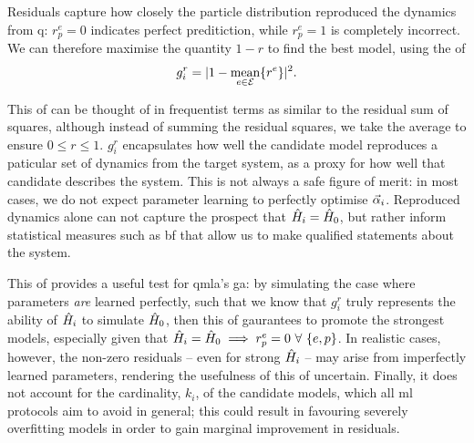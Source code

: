 Residuals capture how closely the \gls{particle} distribution reproduced the dynamics from \gls{q}:
    $r^{e}_{p} = 0$ indicates perfect preditiction, while $r^e_p=1$ is completely incorrect. 
We can therefore maximise the quantity $1-r$ to find the best model, 
    using the \gls{of}
\begin{equation}
    \label{eqn:residual_fitness}
    g^r_i = \lvert 1 - \underset{e \in { \mathcal{E} }}{\text{mean}}\{ {r^e} \}\rvert^2.
\end{equation}
\par     
This \gls{of} can be thought of in frequentist terms 
    as similar to the residual sum of squares,
    although instead of summing the residual squares, we take the average to ensure $0 \leq r \leq 1$. 
$g_i^r$ encapsulates how well the candidate model reproduces a paticular set of dynamics from the target system, 
    as a proxy for how well that candidate describes the system. 
This is not always a safe figure of merit: 
    in most cases, we do not expect parameter learning to perfectly optimise $\vec{\alpha}_i$. 
Reproduced dynamics alone can not capture the prospect that $\hat{H}_i=\hat{H}_0$, 
    but rather inform statistical measures such as \gls{bf} that allow us to make 
    qualified statements about the system. \par 

This \gls{of} provides a useful test for \gls{qmla}'s \gls{ga}:
    by simulating the case where parameters \emph{are} learned perfectly, 
    such that we know that $g_i^r$ truly represents the ability of $\hat{H}_i$ to 
    simulate $\hat{H}_0$, then this \gls{of} gaurantees to promote  the strongest models,
    especially given that $\hat{H}_i=\hat{H}_0 \implies r_p^e=0 \ \forall \ \{e, p\}$. 
In realistic cases, however, the non-zero residuals -- even for 
    strong $\hat{H}_i$ -- may arise from imperfectly learned parameters,
    rendering the usefulness of this \gls{of} uncertain. 
Finally, it does not account for the cardinality, $k_i$, of the candidate models,
    which all \gls{ml} protocols aim to avoid in general;
    this could result in favouring severely overfitting models in order to 
    gain marginal improvement in residuals.

